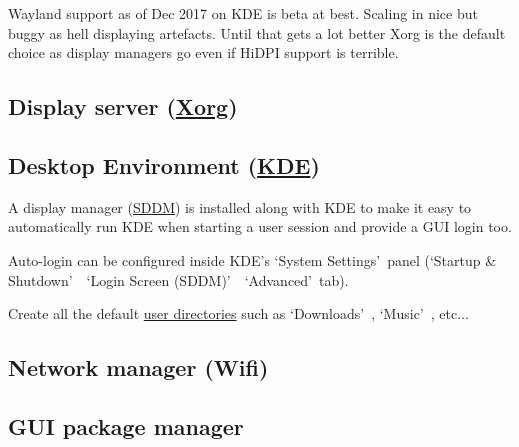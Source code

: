 Wayland support as of Dec 2017 on KDE is beta at best. Scaling in nice but buggy as hell displaying artefacts. Until that gets a lot better Xorg is the default choice as display managers go even if HiDPI support is terrible. 

\subsection{Display server (\href{https://wiki.archlinux.org/index.php/xorg}{Xorg})}


\subsection{Desktop Environment (\href{https://wiki.archlinux.org/index.php/KDE}{KDE})}

A display manager (\href{https://wiki.archlinux.org/index.php/SDDM}{SDDM}) is installed along with KDE to make it easy to automatically run KDE when starting a user session and provide a GUI login too.


Auto-login can be configured inside KDE's \lq System Settings\rq\ panel (\lq Startup \& Shutdown\rq\ \rightarrow\ \lq Login Screen (SDDM)\rq\ \rightarrow\ \lq Advanced\rq\ tab).

\begin{blocksection}
	Create all the default \href{https://wiki.archlinux.org/index.php/XDG_user_directories}{user directories} such as \lq Downloads\rq\ , \lq Music\rq\  , etc...
\end{blocksection}

\subsection{Network manager (Wifi)}

\subsection{GUI package manager}

